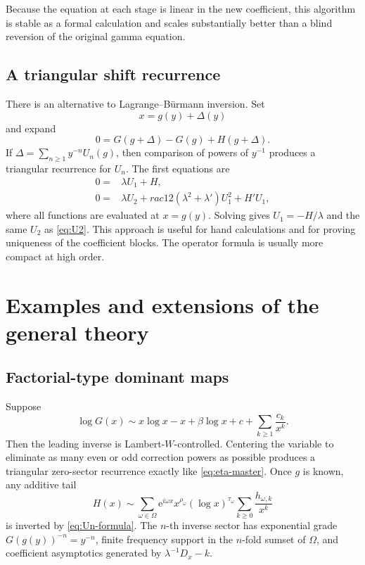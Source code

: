 \documentclass[11pt,oneside]{article}
\theoremstyle{plain}
\theoremstyle{definition}
\theoremstyle{remark}
\newcommand{\ee}{\mathrm{e}}
\begin{document}
Because the equation at each stage is linear in the new coefficient, this
algorithm is stable as a formal calculation and scales substantially better
than a blind reversion of the original gamma equation.

\subsection{A triangular shift recurrence}

There is an alternative to Lagrange--B\"urmann inversion.  Set
\begin{equation}
 x=g(y)+\Delta(y)
 \label{eq:Delta-shift}
\end{equation}
and expand
\begin{equation}
 0=G(g+\Delta)-G(g)+H(g+\Delta).
 \label{eq:Delta-equation}
\end{equation}
If \(\Delta=\sum_{n\ge1}y^{-n}U_n(g)\), then comparison of powers of \(y^{-1}\)
produces a triangular recurrence for \(U_n\).  The first equations are
\begin{align}
 0={}&\lambda U_1+H,
 \label{eq:shift-U1}\\
 0={}&\lambda U_2+
rac12(\lambda^2+\lambda')U_1^2+H'U_1,
 \label{eq:shift-U2}
\end{align}
where all functions are evaluated at \(x=g(y)\).  Solving gives
\(U_1=-H/\lambda\) and the same \(U_2\) as \eqref{eq:U2}.  This approach is
useful for hand calculations and for proving uniqueness of the coefficient
blocks.  The operator formula is usually more compact at high order.

\section{Examples and extensions of the general theory}
\label{sec:extensions}

\subsection{Factorial-type dominant maps}

Suppose
\begin{equation}
 \log G(x)\sim x\log x-x+\beta\log x+c
 +\sum_{k\ge1}\frac{c_k}{x^k}.
 \label{eq:factorial-type-G}
\end{equation}
Then the leading inverse is Lambert-\(W\)-controlled.  Centering the variable
to eliminate as many even or odd correction powers as possible produces a
triangular zero-sector recurrence exactly like \eqref{eq:eta-master}.  Once
\(g\) is known, any additive tail
\begin{equation}
 H(x)\sim\sum_{\omega\in\Omega}\ee^{i\omega x}
 x^{\rho_\omega}(\log x)^{\tau_\omega}
 \sum_{k\ge0}\frac{h_{\omega,k}}{x^k}
 \label{eq:factorial-additive-tail}
\end{equation}
is inverted by \eqref{eq:Un-formula}.  The \(n\)-th inverse sector has
exponential grade \(G(g(y))^{-n}=y^{-n}\), finite frequency support in the
\(n\)-fold sumset of \(\Omega\), and coefficient asymptotics generated by
\(\lambda^{-1}D_x-k\).
\end{document}
